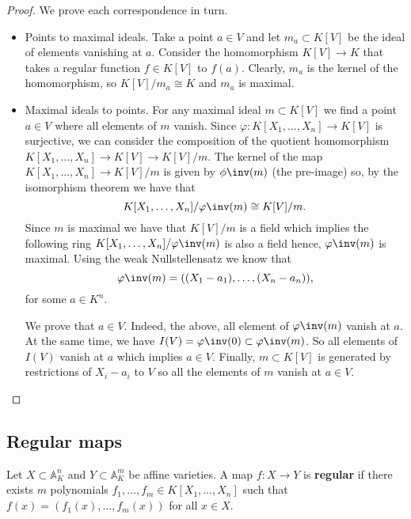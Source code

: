\documentclass[12pt, a4paper]{article}
\renewcommand{\AA}{\mathbb A}
\begin{document}
\begin{proof}
    We prove each correspondence in turn.
    \begin{itemize}
        \item Points to maximal ideals. Take a point \(a\in V\) and let \(m_a \subset K[V]\) be the ideal of elements vanishing at \(a\). Consider the homomorphism \(K[V] \to K\) that takes a regular function \(f \in K[V]\) to \(f(a)\). Clearly, \(m_a\) is the kernel of the homomorphism, so \(K[V]/m_a\cong K\) and \(m_a\) is maximal.
        \item Maximal ideals to points. For any maximal ideal \(m \subset K[V]\) we find a point \(a\in V\) where all elements of \(m\) vanish. Since \(\varphi : K[X_1,\ldots,X_n] \to K[V]\) is surjective, we can consider the composition of the quotient homomorphism \(K[X_1,\ldots,X_n] \to K[V] \to K[V]/m\). The kernel of the map \({K[X_1,\ldots,X_n] \to K[V]/m}\) is given by \(\phi\inv(m)\) (the pre-image) so, by the isomorphism theorem we have that 
        \[K[X_1,\ldots,X_n]/\varphi\inv(m)\cong K[V]/m.\]
        Since \(m\) is maximal we have that \(K[V]/m\) is a field which implies the following ring \({K[X_1,\ldots,X_n]/\varphi\inv(m)}\) is also a field hence, \(\varphi\inv(m)\) is maximal. Using the weak Nullstellensatz we know that 
        \[\varphi\inv(m)=((X_1-a_1),\ldots,(X_n-a_n)),\]
        for some \(a\in K^n\). 

        We prove that \(a\in V\). Indeed, the above, all element of \(\varphi\inv(m)\) vanish at \(a\). At the same time, we have \(I(V)=\varphi\inv(0)\subset \varphi\inv(m)\). So all elements of \(I(V)\) vanish at \(a\) which implies \(a\in V\). Finally, \(m \subset K[V]\) is generated by restrictions of \(X_i-a_i\) to \(V\) so all the elements of \(m\) vanish at \(a\in V\).
    \end{itemize}
\end{proof}

\subsection{Regular maps}

\begin{definition}
    Let \(X \subset \AA_K^n\) and \(Y \subset \AA^m_K\) be affine varieties. A map \({f:X \to Y}\) is \textbf{regular} if there exists \(m\) polynomials \(f_1,\ldots,f_m \in K[X_1,\ldots,X_n]\) such that \(f(x)=\left( f_1(x),\ldots,f_m(x) \right)\) for all \(x\in X\).
\end{definition}
\end{document}
